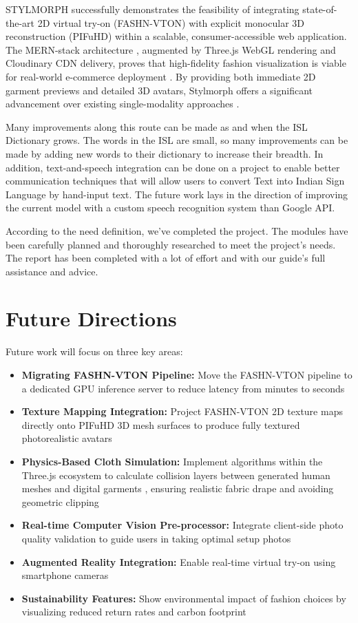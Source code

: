 \documentclass[12pt,a4paper,oneside]{report}
\begin{document}
STYLMORPH successfully demonstrates the feasibility of integrating state-of-the-art 2D virtual try-on (FASHN-VTON) \cite{16} with explicit monocular 3D reconstruction (PIFuHD) \cite{1} within a scalable, consumer-accessible web application. The MERN-stack architecture \cite{19}, augmented by Three.js WebGL rendering \cite{6} and Cloudinary CDN delivery, proves that high-fidelity fashion visualization is viable for real-world e-commerce deployment \cite{5, 7}. By providing both immediate 2D garment previews and detailed 3D avatars, Stylmorph offers a significant advancement over existing single-modality approaches \cite{17, 18}.

Many improvements along this route can be made as and when the ISL Dictionary grows. The words in the ISL are small, so many improvements can be made by adding new words to their dictionary to increase their breadth. In addition, text-and-speech integration can be done on a project to enable better communication techniques that will allow users to convert Text into Indian Sign Language by hand-input text. The future work lays in the direction of improving the current model with a custom speech recognition system than Google API.

According to the need definition, we've completed the project. The modules have been carefully planned and thoroughly researched to meet the project's needs. The report has been completed with a lot of effort and with our guide's full assistance and advice.

\section{Future Directions}

Future work will focus on three key areas:

\begin{itemize}
    \item \textbf{Migrating FASHN-VTON Pipeline:} Move the FASHN-VTON pipeline \cite{16} to a dedicated GPU inference server to reduce latency from minutes to seconds
    \item \textbf{Texture Mapping Integration:} Project FASHN-VTON 2D texture maps \cite{16} directly onto PIFuHD 3D mesh surfaces \cite{1} to produce fully textured photorealistic avatars
    \item \textbf{Physics-Based Cloth Simulation:} Implement algorithms within the Three.js ecosystem \cite{6} to calculate collision layers between generated human meshes and digital garments \cite{15}, ensuring realistic fabric drape and avoiding geometric clipping
    \item \textbf{Real-time Computer Vision Pre-processor:} Integrate client-side photo quality validation \cite{9, 10} to guide users in taking optimal setup photos
    \item \textbf{Augmented Reality Integration:} Enable real-time virtual try-on using smartphone cameras \cite{5}
    \item \textbf{Sustainability Features:} Show environmental impact of fashion choices by visualizing reduced return rates and carbon footprint \cite{5}
\end{itemize}
\end{document}

